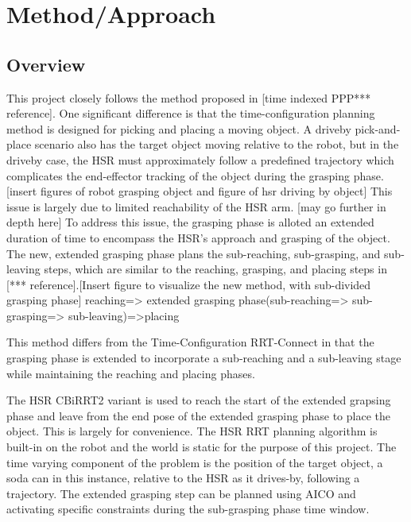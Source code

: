 \documentclass[12pt]{article}
\begin{document}
    \section{Method/Approach}
        \subsection{Overview}
            This project closely follows the method proposed in [time indexed PPP*** reference]. One significant difference is that the  time-configuration planning method is designed for picking and placing a moving object. A driveby pick-and-place scenario also has the target object moving relative to the robot, but in the driveby case, the HSR must approximately follow a predefined trajectory which complicates the end-effector tracking of the object during the grasping phase. [insert figures of robot grasping object and figure of hsr driving by object] This issue is largely due to limited reachability of the HSR arm. [may go further in depth here] To address this issue, the grasping phase is alloted an extended duration of time to encompass the HSR's approach and grasping of the object. The new, extended grasping phase plans the sub-reaching, sub-grasping, and sub-leaving steps, which are similar to the reaching, grasping, and placing steps in [*** reference].[Insert figure to visualize the new method, with sub-divided grasping phase] reaching=> extended grasping phase(sub-reaching=> sub-grasping=> sub-leaving)=>placing

            \par This method differs from the Time-Configuration RRT-Connect in that the grasping phase is extended to incorporate a sub-reaching and a sub-leaving stage while maintaining the reaching and placing phases. 

            \par The HSR CBiRRT2 variant is used to reach the start of the extended grapsing phase and leave from the end pose of the extended grasping phase to place the object. This is largely for convenience. The HSR RRT planning algorithm is built-in on the robot and the world is static for the purpose of this project. The time varying component of the problem is the position of the target object, a soda can in this instance, relative to the HSR as it drives-by, following a trajectory. 
            The extended grasping step can be planned using AICO and activating specific constraints during the sub-grasping phase time window.
        
\end{document}
